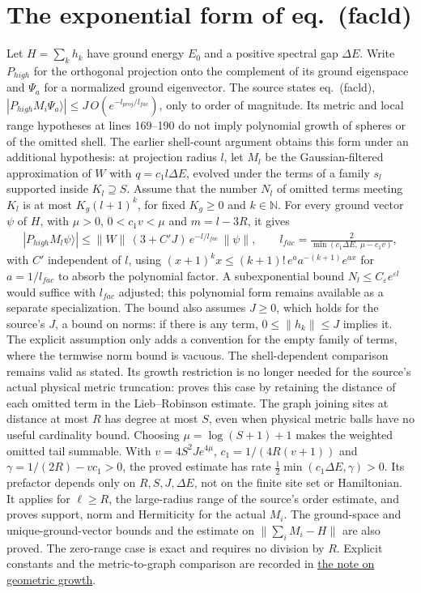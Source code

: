 \documentclass{article}
\begin{document}
\section{The exponential form of eq.~(facld)}
Let $H=\sum_k h_k$ have ground energy $E_0$ and a positive spectral gap
$\Delta E$. Write $P_{high}$ for the orthogonal projection onto the complement
of its ground eigenspace and $\Psi_a$ for a normalized ground eigenvector.
The source states eq.~(facld), $|P_{high}M_i\Psi_a\rangle|\le
J\,O(e^{-l_{proj}/l_{fac}})$, only to order of magnitude. Its metric and local
range hypotheses at lines 169--190 do not imply polynomial growth of spheres
or of the omitted shell. The earlier shell-count argument obtains this form
under an additional hypothesis: at projection radius $l$, let $M_l$ be the
Gaussian-filtered approximation of $W$ with $q=c_1l\Delta E$, evolved under
the terms of a family $s_l$ supported inside $K_l\supseteq S$. Assume that
the number $N_l$ of omitted terms meeting $K_l$ is at most $K_g(l+1)^k$, for
fixed $K_g\ge0$ and $k\in\mathbb N$. For every ground vector $\psi$ of $H$,
with $\mu>0$, $0<c_1v<\mu$ and $m=l-3R$, it gives
\begin{align}
  |P_{high}M_l\psi\rangle|\le\|W\|\,(3+C'J)\,e^{-l/l_{fac}}\,\|\psi\|,
  \qquad
  l_{fac}=\frac{2}{\min(c_1\Delta E,\ \mu-c_1v)},
  \label{eq:hastings05_truncated_dynamics_facld_decay}
\end{align}
with $C'$ independent of $l$, using $(x+1)^kx\le(k+1)!\,e^{a}a^{-(k+1)}e^{ax}$
for $a=1/l_{fac}$ to absorb the polynomial factor. A subexponential bound
$N_l\le C_\varepsilon e^{\varepsilon l}$ would suffice with $l_{fac}$ adjusted;
this polynomial form remains available as a separate specialization. The bound also assumes $J\ge0$,
which holds for the source's $J$, a bound on norms: if there is any term,
$0\le\|h_k\|\le J$ implies it. The explicit assumption only adds a convention
for the empty family of terms, where the termwise norm bound is vacuous.
The shell-dependent comparison remains valid as stated. Its growth restriction
is no longer needed for the source's actual physical metric truncation:
 proves this case by retaining the
distance of each omitted term in the Lieb--Robinson estimate. The graph
joining sites at distance at most $R$ has degree at most $S$, even when physical
metric balls have no useful cardinality bound. Choosing
$\mu=\log(S+1)+1$ makes the weighted omitted tail summable. With
$v=4S^2Je^{4\mu}$, $c_1=1/(4R(v+1))$ and
$\gamma=1/(2R)-vc_1>0$, the proved estimate has rate
$\tfrac12\min(c_1\Delta E,\gamma)>0$. Its prefactor depends only on
$R,S,J,\Delta E$, not on the finite site set or Hamiltonian. It applies for
$\ell\ge R$, the large-radius range of the source's order estimate, and
proves support, norm and Hermiticity for the actual $M_i$. The ground-space
and unique-ground-vector bounds and the estimate on $\|\sum_iM_i-H\|$ are
also proved. The zero-range case is exact and requires no division by $R$.
Explicit constants and the metric-to-graph comparison are recorded in
\href{https://sirui-lu.com/TNLean/paper-gaps/hastings05_geometric_growth_scope.pdf}
{the note on geometric growth}.
\end{document}
